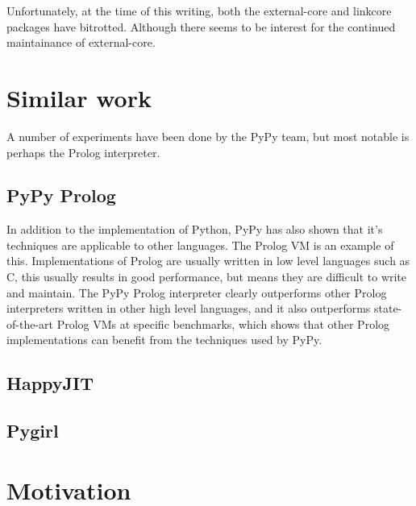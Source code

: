 Unfortunately, at the time of this writing, both the external-core and linkcore 
packages have bitrotted. Although there seems to be interest for the continued 
maintainance of external-core.

\section{Similar work}

A number of experiments have been done by the PyPy team, but most notable is perhaps
the Prolog interpreter. 

\subsection{PyPy Prolog}

In addition to the implementation of Python, PyPy has also shown that it's techniques
are applicable to other languages. The Prolog VM is an example of this. Implementations
of Prolog are usually written in low level languages such as C, this usually results in
good performance, but means they are difficult to write and maintain. The PyPy Prolog 
interpreter clearly outperforms other Prolog interpreters written in other high level
languages, and it also outperforms state-of-the-art Prolog VMs at specific benchmarks,
which shows that other Prolog implementations can benefit from the techniques used by
PyPy. \cite{bolz2010towards}


\subsection{HappyJIT}

\subsection{Pygirl}

\section{Motivation}




